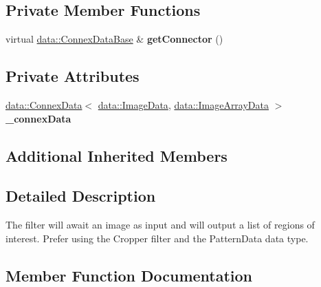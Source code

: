 \subsection*{Private Member Functions}
\begin{DoxyCompactItemize}
\item 
\mbox{\label{classfilter_1_1_algos_1_1_crop_aafc2aafee9f936a60c9dbbe90d8d41a7}} 
virtual \hyperlink{classfilter_1_1data_1_1_connex_data_base}{data\+::\+Connex\+Data\+Base} \& {\bfseries get\+Connector} ()
\end{DoxyCompactItemize}
\subsection*{Private Attributes}
\begin{DoxyCompactItemize}
\item 
\mbox{\label{classfilter_1_1_algos_1_1_crop_a2a6e37101288ffda340ce093efc30f91}} 
\hyperlink{classfilter_1_1data_1_1_connex_data}{data\+::\+Connex\+Data}$<$ \hyperlink{classfilter_1_1data_1_1_image_data}{data\+::\+Image\+Data}, \hyperlink{classfilter_1_1data_1_1_image_array_data}{data\+::\+Image\+Array\+Data} $>$ {\bfseries \+\_\+connex\+Data}
\end{DoxyCompactItemize}
\subsection*{Additional Inherited Members}


\subsection{Detailed Description}
The filter will await an image as input and will output a list of regions of interest. Prefer using the Cropper filter and the Pattern\+Data data type. 

\subsection{Member Function Documentation}
\mbox{\label{classfilter_1_1_algos_1_1_crop_a44ded08379421eb046be865a884139e8}} 
